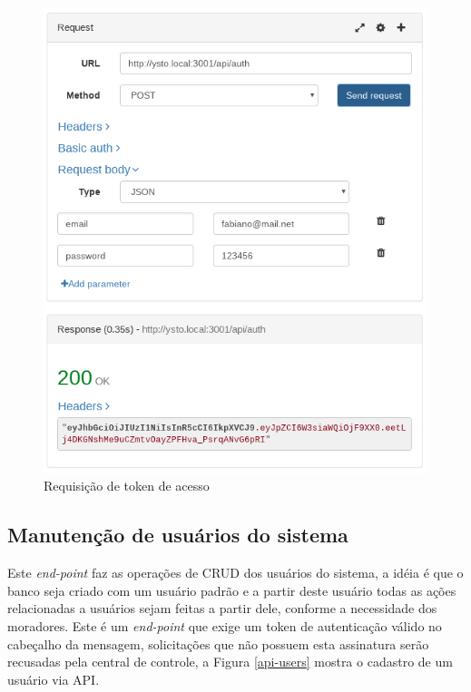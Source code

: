 \begin{figure}[H]
\caption{\label{api-auth} Requisição de token de acesso}
\includegraphics[scale=0.35]{img/06-api-auth.png}
\end{figure}

\subsection{Manutenção de usuários do sistema}
Este \textit{end-point} faz as operações de CRUD dos usuários do sistema, a idéia é que o banco seja criado com um usuário padrão e a partir deste usuário todas as ações relacionadas a usuários sejam feitas a partir dele, conforme a necessidade dos moradores. Este é um \textit{end-point} que exige um token de autenticação válido no cabeçalho da mensagem, solicitações que não possuem esta assinatura serão recusadas pela central de controle, a Figura \ref{api-users} mostra o cadastro de um usuário via API.

